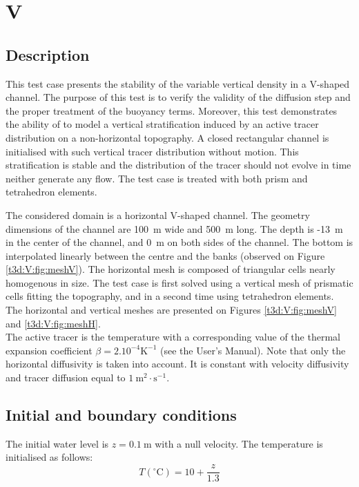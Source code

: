 \chapter{V}

\section{Description}
\bigskip
This test case presents the stability of the variable vertical 
density in a V-shaped channel. The purpose of this test is to verify the 
validity of the diffusion step and the proper treatment of the buoyancy terms. 
Moreover, this test demonstrates the ability of  
to model a vertical stratification induced by an active tracer 
distribution on a non-horizontal topography. A closed rectangular channel 
is initialised with such vertical tracer distribution without motion. 
This stratification is stable and the distribution of the tracer should 
not evolve in time neither generate any flow. The test case is treated
 with both prism and tetrahedron elements.

\bigskip
The considered domain is a horizontal V-shaped channel. 
The geometry dimensions of the channel are 100~m wide and 500~m long. 
The depth is -13~m in the center of the channel, and 0~m on both sides of the channel. 
The bottom is interpolated linearly between the centre and the banks 
(observed on Figure \ref{t3d:V:fig:meshV}).  The horizontal mesh is composed of triangular 
cells nearly homogenous in size. The test case is first solved using 
a vertical mesh of prismatic cells fitting the topography, and in 
a second time using tetrahedron elements. The horizontal and vertical meshes 
are presented on Figures \ref{t3d:V:fig:meshV} and \ref{t3d:V:fig:meshH}.\\
The active tracer is the temperature with a corresponding value of the thermal 
expansion coefficient $\beta = 2.10^{-4}\text{K}^{-1}$ (see the User's Manual). 
Note that only the horizontal diffusivity is taken into account. It is constant 
with velocity diffusivity and tracer diffusion equal to $1~\text{m}^2\cdot\text{s}^{-1}$.

\section{Initial and boundary conditions}
\bigskip
The initial water level is $z = 0.1~\text{m}$ with a null velocity.
The temperature is initialised as follows: 
\begin{equation*}
T (^\circ\text{C}) = 10 + \displaystyle\frac{z}{1.3}
\end{equation*}


